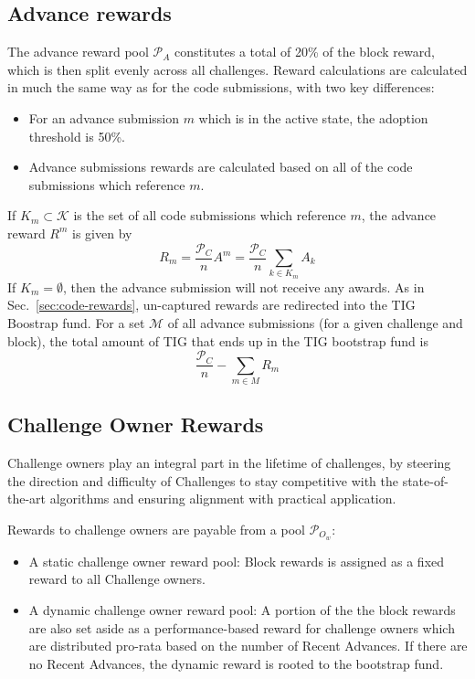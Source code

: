 \documentclass{contract}
\numberwithin{equation}{section}
\begin{document}
\subsection{Advance rewards}
The advance reward pool $\mathcal{P}_A$ constitutes a total of 20\% of the block reward, which is then split evenly across all challenges.
Reward calculations are calculated in much the same way as for the code submissions, with two key differences:
\begin{itemize}
    \item For an advance submission $m$ which is in the active state, the adoption threshold is 50\%. 
    \item Advance submissions rewards are calculated based on all of the code submissions which reference $m$.
\end{itemize}
If $K_m\subset \mathcal{K}$ is the set of all code submissions which reference $m$, the advance reward $R^m$ is given by
\begin{equation}
    R_m = \frac{\mathcal{P}_C}{n}A^m = \frac{\mathcal{P}_C}{n}\sum_{k\in K_m}A_k
\end{equation}
If $K_m = \emptyset$, then the advance submission will not receive any awards.
As in Sec.~\ref{sec:code-rewards}, un-captured rewards are redirected into the TIG Boostrap fund. For a set $\mathcal{M}$ of all advance submissions (for a given challenge and block), the total amount of TIG that ends up in the TIG bootstrap fund is
$$
    \frac{\mathcal{P}_C}{n} - \sum_{m\in M}R_m
$$

\subsection{Challenge Owner Rewards}

Challenge owners play an integral part in the lifetime of challenges, by steering the direction and difficulty of Challenges to stay competitive with the state-of-the-art algorithms and ensuring alignment with practical application.

Rewards to challenge owners are payable from a pool $\mathcal{P}_{O_w}$:
\begin{itemize}
    \item A static challenge owner reward pool: Block rewards is assigned as a fixed reward to all Challenge owners.
    \item A dynamic challenge owner reward pool:  A portion of the the block rewards are also set aside as a performance-based reward for challenge owners which are distributed pro-rata based on the number of Recent Advances. 
		If there are no Recent Advances, the dynamic reward is rooted to the bootstrap fund.
\end{itemize}
\end{document}
